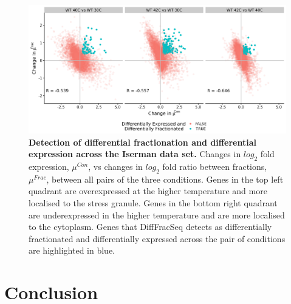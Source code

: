 \documentclass[../main.tex]{subfiles}
\begin{document}
\begin{figure}

{\centering \includegraphics[width=1\linewidth]{figures/DESeq_vs_bayesian_multi_temp_iserman_combined.png} 

}

\caption[Detection of differential expression and fractionation across temperatures.]{\textbf{Detection of differential fractionation and differential expression across the Iserman data set.} Changes in $log_2$ fold expression, $\mu^{Con}$, vs changes in $log_2$ fold ratio between fractions, $\mu^{Frac}$, between all pairs of the three conditions.
Genes in the top left quadrant are overexpressed at the higher temperature and more localised to the stress granule. Genes in the bottom right quadrant are underexpressed in the higher temperature and are more localised to the cytoplasm. Genes that DiffFracSeq detects as differentially fractionated and differentially expressed across the pair of conditions are highlighted in blue.} \label{fig:diff-exp-temp}
\end{figure}

\section{Conclusion}
\end{document}
